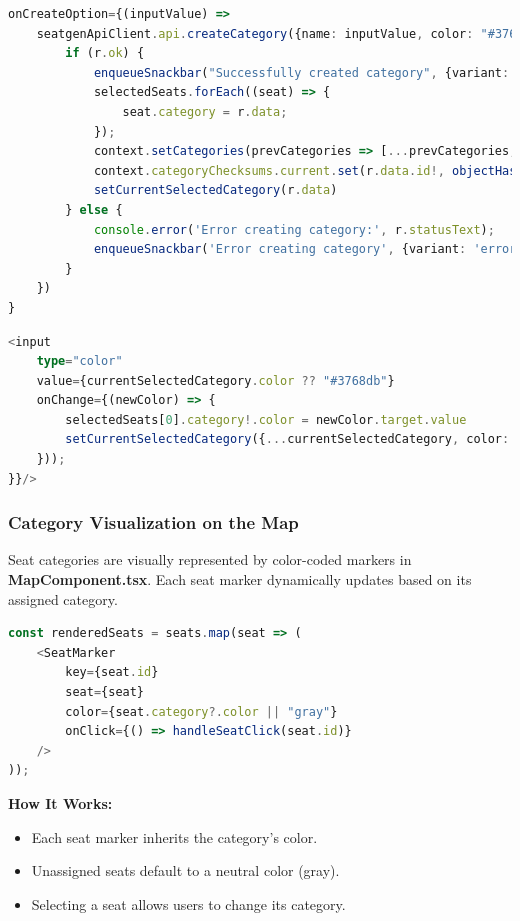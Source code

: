 \begin{lstlisting}[language=TypeScript, caption=Managing Categories, label=lst:manage-categories]
onCreateOption={(inputValue) =>
    seatgenApiClient.api.createCategory({name: inputValue, color: "#3768db"}).then((r) => {
        if (r.ok) {
            enqueueSnackbar("Successfully created category", {variant: 'success'})
            selectedSeats.forEach((seat) => {
                seat.category = r.data;
            });
            context.setCategories(prevCategories => [...prevCategories, r.data]);
            context.categoryChecksums.current.set(r.data.id!, objectHash(r.data))
            setCurrentSelectedCategory(r.data)
        } else {
            console.error('Error creating category:', r.statusText);
            enqueueSnackbar('Error creating category', {variant: 'error'});
        }
    })
}
\end{lstlisting}

\begin{lstlisting}[language=TypeScript, caption=Managing Category Color, label=lst:manage-categories]
<input 
    type="color"
    value={currentSelectedCategory.color ?? "#3768db"}
    onChange={(newColor) => {
        selectedSeats[0].category!.color = newColor.target.value
        setCurrentSelectedCategory({...currentSelectedCategory, color: newColor.target.value})
    }));
}}/>
\end{lstlisting}

\subsubsection{Category Visualization on the Map}

Seat categories are visually represented by color-coded markers in \textbf{MapComponent.tsx}. Each seat marker dynamically updates based on its assigned category.

\begin{lstlisting}[language=TypeScript, caption=Rendering Seat Markers with Categories, label=lst:render-seat-category]
const renderedSeats = seats.map(seat => (
    <SeatMarker 
        key={seat.id} 
        seat={seat} 
        color={seat.category?.color || "gray"} 
        onClick={() => handleSeatClick(seat.id)}
    />
));
\end{lstlisting}

\textbf{How It Works:}
\begin{itemize}
    \item Each seat marker inherits the category's color.
    \item Unassigned seats default to a neutral color (gray).
    \item Selecting a seat allows users to change its category.
\end{itemize}

